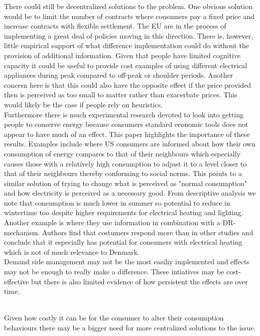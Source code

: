 There could still be decentralized solutions to the problem. One obvious solution would be to limit the number of contracts where consumers pay a fixed price and increase contracts with flexible settlement. The EU are in the process of implementing a great deal of policies moving in this direction. There is, however, little empirical support of what difference implementation could do without the provision of additional information. Given that people have limited cognitive capacity it could be useful to provide cost examples of using different electrical appliances during peak compared to off-peak or shoulder periods. 
Another concern here is that this could also have the opposite effect if the price provided then is perceived as too small to matter rather than exacerbate prices. This would likely be the case if people rely on heuristics.
\smallskip \\

Furthermore there is much experimental research devoted to look into getting people to conserve energy because consumers standard economic tools does not appear to have much of an effect. This paper highlights the importance of these results. Examples include \citep{allcott2011social} where US consumers are informed about how their own consumption of energy compares to that of their neighbours which especially causes those with a relatively high consumption to adjust it to a level closer to that of their neighbours thereby conforming to social norms. This points to a similar solution of trying to change what is perceived as "normal consumption" and how electricity is perceived as a necessary good. From descriptive analysis we note that consumption is much lower in summer so potential to reduce in wintertime too despite higher requirements for electrical heating and lighting. Another example is \citep{saele2011demand} where they use information in combination with a DR-mechanism. Authors find that costumers respond more than in other studies and conclude that it especially has potential for consumers with electrical heating which is not of much relevance to Denmark.
\smallskip \\

Demand side management may not be the most easiliy implemented and effects may not be enough to really make a difference. These intiatives may be cost-effective but there is also limited evidence of how persistent the effects are over time.

\smallskip \\ %
Given how costly it can be for the consumer to alter their consumption behaviours there may be a bigger need for more centralized solutions to the issue.

